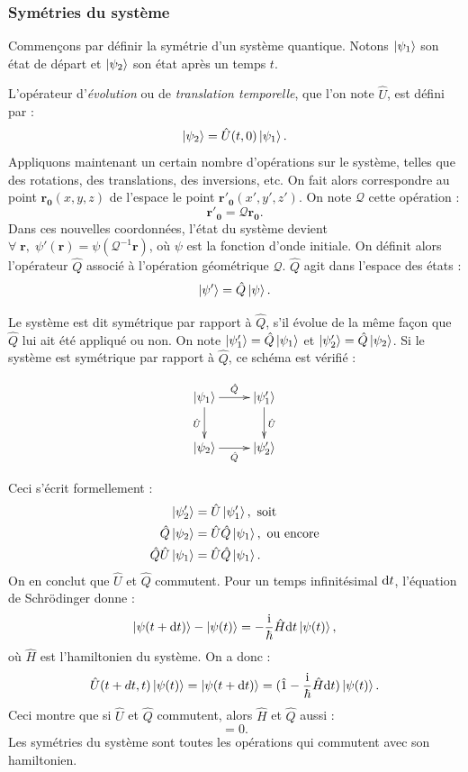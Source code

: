 \subsubsection{Symétries du système}
Commençons par définir la symétrie d'un système quantique. Notons $\ket{\psi_1}$ son état de départ et $\ket{\psi_2}$ son état après un temps $t$. \par
L'opérateur d'\textit{évolution} ou de \textit{translation temporelle}, que l'on note $\hat{U}$, est défini par :
\begin{equation}
\ket{\psi_2}=\hat{U}(t,0)\ket{\psi_1}.
\end{equation}
Appliquons maintenant un certain nombre d'opérations sur le système, telles que des rotations, des translations, des inversions, etc. On fait alors correspondre au point $\bm{r_0}(x,y,z)$ de l'espace le point $\bm{r'_0}(x',y',z')$. On note $\mathcal{Q}$ cette opération :
\[  \bm{r'_0} = \mathcal{Q} \bm{r_0}.\]
Dans ces nouvelles coordonnées, l'état du système devient $\forall\;\bm{r},\;\psi'(\bm{r}) = \psi(\mathcal{Q}^{-1}\bm{r})$, où $\psi$ est la fonction d'onde initiale. On définit alors l'opérateur $\hat{Q}$ associé à l'opération géométrique $\mathcal{Q}$. $\hat{Q}$ agit dans l'espace des états : 
\[\ket{\psi'} = \hat{Q}\ket{\psi}.\]

Le système est dit symétrique par rapport à $\hat{Q}$, s'il évolue de la même façon que $\hat{Q}$ lui ait été appliqué ou non. On note $\ket{\psi'_1}=\hat{Q}\ket{\psi_1}$ et $\ket{\psi'_2}=\hat{Q}\ket{\psi_2}$. Si le système est symétrique par rapport à $\hat{Q}$, ce schéma est vérifié :

\begin{displaymath}
    \xymatrix{
        \ket{\psi_1} \ar[r]^{\hat{Q}} \ar[d]_{\hat{U}} & \ket{\psi'_1} \ar[d]^{\hat{U}} \\
        \ket{\psi_2} \ar[r]_{\hat{Q}}       & \ket{\psi'_2} }
\end{displaymath}

Ceci s'écrit formellement :
\begin{align}
\ket{\psi'_2}&=\hat{U}\ket{\psi'_1}, \mbox{ soit}\\
\hat{Q}\ket{\psi_2}&=\hat{U}\hat{Q}\ket{\psi_1}, \mbox{ ou encore}\\
\hat{Q}\hat{U}\ket{\psi_1}&=\hat{U}\hat{Q}\ket{\psi_1}.
\end{align}
On en conclut que $\hat{U}$ et $\hat{Q}$ commutent. Pour un temps infinitésimal $\mathrm{d} t$, l'équation de Schrödinger donne :
\begin{equation}
\ket{\psi(t+\mathrm{d} t)}-\ket{\psi(t)} = -\frac{\mathrm{i}}{\hbar} \hat{H}\mathrm{d} t\ket{\psi(t)},
\end{equation}
où $\hat{H}$ est l'hamiltonien du système. On a donc :
\begin{equation}
\hat{U}(t+dt,t)\ket{\psi(t)} = \ket{\psi(t+\mathrm{d} t)} = (\hat{1}-\frac{\mathrm{i}}{\hbar} \hat{H}\mathrm{d} t)\ket{\psi(t)}.
\end{equation}
Ceci montre que si $\hat{U}$ et $\hat{Q}$ commutent, alors $\hat{H}$ et $\hat{Q}$ aussi :
\begin{equation}
[\hat{H},\hat{Q}]=0.
\end{equation}
Les symétries du système sont toutes les opérations qui commutent avec son hamiltonien.

